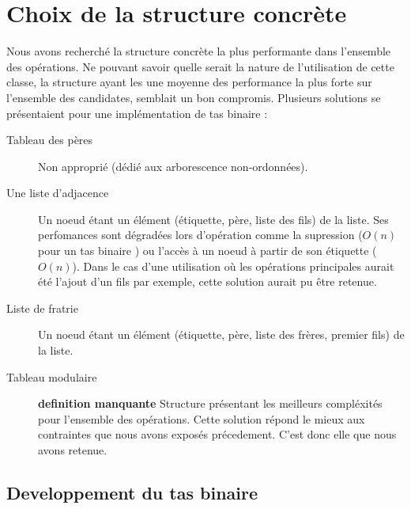 \chapter[Concrète]{Choix de la structure concrète%
}


Nous avons recherché la structure concrète la plus performante dans l'ensemble des opérations. Ne pouvant savoir quelle serait la nature de l'utilisation de cette classe, la structure ayant les une moyenne des performance la plus forte sur l'ensemble des candidates, semblait un bon compromis.
Plusieurs solutions se présentaient pour une implémentation de tas binaire :
\begin{description}
\item
[Tableau des pères] Non approprié (dédié aux arborescence non-ordonnées).
\item[Une liste d'adjacence] Un noeud étant un élément  (étiquette, père, liste des fils) de la liste. Ses perfomances sont dégradées lors d'opération comme la supression ($O(n)$ pour un tas binaire ) ou l'accès à un noeud à partir de son étiquette ($O(n)$). Dans le cas d'une utilisation où les opérations principales aurait été l'ajout d'un fils par exemple, cette solution aurait pu être retenue.
\item[Liste de fratrie]  Un noeud étant un élément (étiquette, père, liste des frères, premier fils)  de la liste.
\item[Tableau modulaire]
\textbf{definition manquante} Structure présentant les meilleurs compléxités pour l'ensemble des opérations. Cette solution répond le mieux aux contraintes que nous avons exposés précedement. C'est donc elle que nous avons retenue. 
\end{description} 


\section[Developpement]{Developpement du tas binaire%
}

